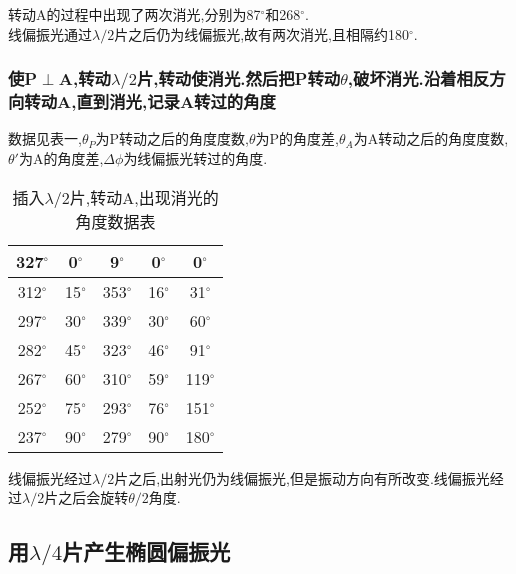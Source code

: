 \documentclass[a4paper,10pt,notitlepage]{article}
\begin{document}
	转动A的过程中出现了两次消光,分别为87$^{\circ}$和268$^{\circ}$. \\
	
	线偏振光通过$\lambda / 2$片之后仍为线偏振光,故有两次消光,且相隔约180$^\circ$. \\
	
\subsubsection{使P$\perp$A,转动$\lambda / 2$片,转动使消光.然后把P转动$\theta$,破坏消光.沿着相反方向转动A,直到消光,记录A转过的角度}

	数据见表一,$\theta_P$为P转动之后的角度度数,$\theta$为P的角度差,$\theta_A$为A转动之后的角度度数,$\theta'$为A的角度差,$\Delta \phi$为线偏振光转过的角度. \\
	
\begin{table}
\centering

	\begin{tabular}{|c|c|c|c|c|}
	\hline
	327$^{\circ}$ & 0$^{\circ}$ & 9$^{\circ}$ & 0$^{\circ}$ & 0$^{\circ}$ \\
	\hline
	312$^{\circ}$ & 15$^{\circ}$ & 353$^{\circ}$ & 16$^{\circ}$ & 31$^{\circ}$ \\
	\hline
	297$^{\circ}$ & 30$^{\circ}$ & 339$^{\circ}$ & 30$^{\circ}$ & 60$^{\circ}$ \\
	\hline
	282$^{\circ}$ & 45$^{\circ}$ & 323$^{\circ}$ & 46$^{\circ}$ & 91$^{\circ}$ \\
	\hline
	267$^{\circ}$ & 60$^{\circ}$ & 310$^{\circ}$ & 59$^{\circ}$ & 119$^{\circ}$ \\
	\hline
	252$^{\circ}$ & 75$^{\circ}$ & 293$^{\circ}$ & 76$^{\circ}$ & 151$^{\circ}$ \\
	\hline
	237$^{\circ}$ & 90$^{\circ}$ & 279$^{\circ}$ & 90$^{\circ}$ & 180$^{\circ}$ \\
	\hline
	
	\end{tabular}
	\caption{插入$\lambda / 2$片,转动A,出现消光的角度数据表}
\end{table}
	
	线偏振光经过$\lambda / 2$片之后,出射光仍为线偏振光,但是振动方向有所改变.线偏振光经过$\lambda / 2$片之后会旋转$\theta / 2$角度. \\

\subsection{用$\lambda / 4$片产生椭圆偏振光}
\end{document}
